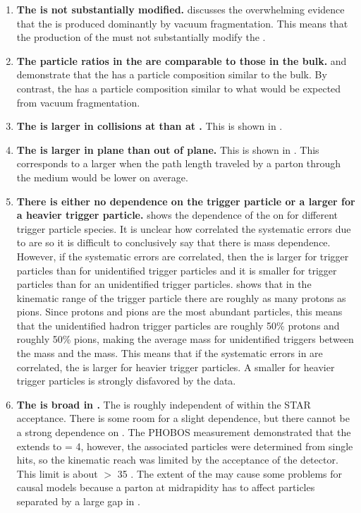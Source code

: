 \begin{enumerate}
 \item  \textbf{The \jlc is not substantially modified.}   discusses the overwhelming evidence that the \jlc is produced dominantly by vacuum fragmentation.  This means that the production of the \ridge must not substantially modify the \jlc.\label{JetNotMod}
 \item  \textbf{The particle ratios in the \ridge are comparable to those in the bulk.}   and  demonstrate that the \ridge has a particle composition similar to the bulk.  By contrast, the \jlc has a particle composition similar to what would be expected from vacuum fragmentation.\label{PartRatios}
 \item  \textbf{The \ridge is larger in collisions at \sNNtwohundred than at \sNNsixtytwo.}  This is shown in .\label{EnergyDep}
 \item  \textbf{The \ridge is larger in plane than out of plane.}  This is shown in .  This corresponds to a larger \ridge when the path length traveled by a parton through the medium would be lower on average.\label{RxnDep}
 \item  \textbf{There is either no dependence on the trigger particle or a larger \ridge for a heavier trigger particle.}   shows the dependence of the \ridge on \npart for different trigger particle species.  It is unclear how correlated the systematic errors due to \vtwo are so it is difficult to conclusively say that there is mass dependence.  However, if the systematic errors are correlated, then the \ridge is larger for \lam trigger particles than for unidentified trigger particles and it is smaller for \kaon trigger particles than for an unidentified trigger particles.   shows that in the kinematic range of the trigger particle there are roughly as many protons as pions.  Since protons and pions are the most abundant particles, this means that the unidentified hadron trigger particles are roughly 50\% protons and roughly 50\% pions, making the average mass for unidentified triggers between the \lam mass and the \kaon mass.  This means that if the systematic errors in  are correlated, the \ridge is larger for heavier trigger particles.  A smaller \ridge for heavier trigger particles is strongly disfavored by the data.\label{TrigDep}
\item  \textbf{The \ridge is broad in \deta.} The \ridge is roughly independent of \deta within the STAR acceptance.  There is some room for a slight \deta dependence, but there cannot be a strong dependence on \deta. The PHOBOS measurement \cite{Wenger:2008ts} demonstrated that the \ridge extends to \deta = 4, however, the associated particles were determined from single hits, so the kinematic reach was limited by the acceptance of the detector.  This limit is about \pT $>$ 35 \MeV.  The extent of the \ridge may cause some problems for causal models because a parton at midrapidity has to affect particles separated by a large gap in \deta.\label{Extent}
\end{enumerate}

